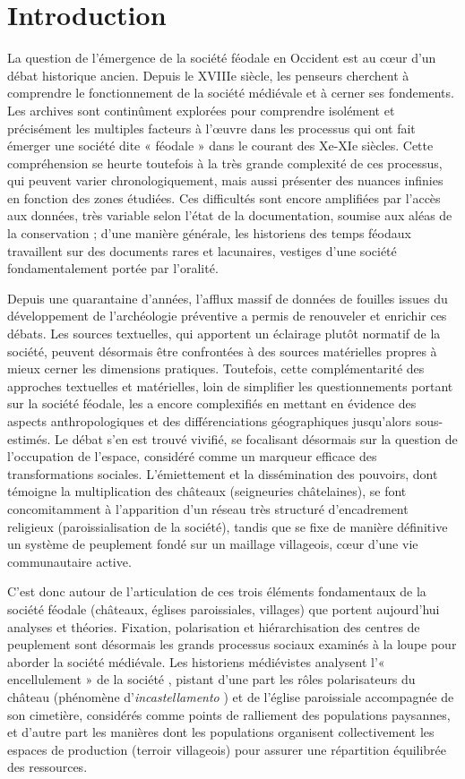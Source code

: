 \section{Introduction}

La question de l'émergence de la société féodale en Occident est au cœur d'un débat historique ancien.
Depuis le XVIIIe siècle, les penseurs cherchent à comprendre le fonctionnement de la société médiévale et à cerner ses fondements.
Les archives sont continûment explorées pour comprendre isolément et précisément les multiples facteurs à l'œuvre dans les processus qui ont fait émerger une société dite « féodale » dans le courant des Xe-XIe siècles.
Cette compréhension se heurte toutefois à la très grande complexité de ces processus, qui peuvent varier chronologiquement, mais aussi présenter des nuances infinies en fonction des zones étudiées.
Ces difficultés sont encore amplifiées par l'accès aux données, très variable selon l'état de la documentation, soumise aux aléas de la conservation ; d'une manière générale, les historiens des temps féodaux travaillent sur des documents rares et lacunaires, vestiges d'une société fondamentalement portée par l'oralité.

Depuis une quarantaine d'années, l'afflux massif de données de fouilles issues du développement de l'archéologie préventive a permis de renouveler et enrichir ces débats.
Les sources textuelles, qui apportent un éclairage plutôt normatif de la société, peuvent désormais être confrontées à des sources matérielles propres à mieux cerner les dimensions pratiques.
Toutefois, cette complémentarité des approches textuelles et matérielles, loin de simplifier les questionnements portant sur la société féodale, les a encore complexifiés en mettant en évidence des aspects anthropologiques et des différenciations géographiques jusqu'alors sous-estimés.
Le débat s'en est trouvé vivifié, se focalisant désormais sur la question de l'occupation de l'espace, considéré comme un marqueur efficace des transformations sociales.
L'émiettement et la dissémination des pouvoirs, dont témoigne la multiplication des châteaux (seigneuries châtelaines), se font concomitamment à l'apparition d'un réseau très structuré d'encadrement religieux (paroissialisation de la société), tandis que se fixe de manière définitive un système de peuplement fondé sur un maillage villageois, cœur d'une vie communautaire active.

C'est donc autour de l'articulation de ces trois éléments fondamentaux de la société féodale (châteaux, églises paroissiales, villages) que portent aujourd'hui analyses et théories.
Fixation, polarisation et hiérarchisation des centres de peuplement sont désormais les grands processus sociaux examinés à la loupe pour aborder la société médiévale.
Les historiens médiévistes analysent l'« encellulement » de la société \autocite{fossier_enfance_1982}, pistant d'une part les rôles polarisateurs du château (phénomène d'\textit{incastellamento} \autocite{toubert_les_1973}) et de l'église paroissiale accompagnée de son cimetière, considérés comme points de ralliement des populations paysannes, et d'autre part les manières dont les populations organisent collectivement les espaces de production (terroir villageois) pour assurer une répartition équilibrée des ressources.

